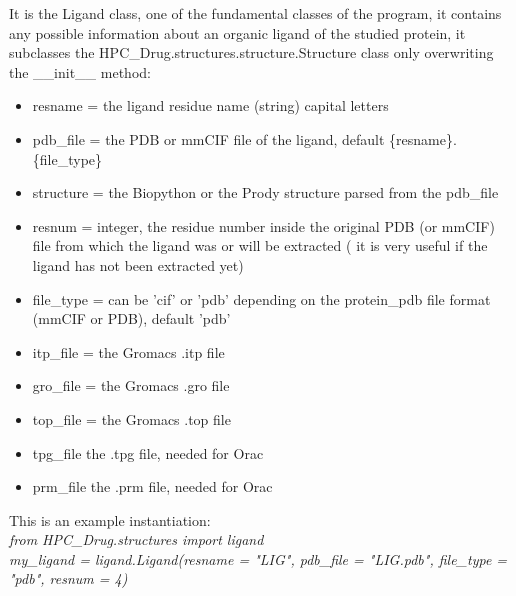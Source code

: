 	It is the Ligand class, one of the fundamental classes of the program, it contains any possible information about an organic ligand of the studied protein, it subclasses the HPC\_Drug.structures.structure.Structure class only overwriting the \_\_init\_\_ method:
	\begin{itemize}
		\item resname = the ligand residue name (string) capital letters
		\item pdb\_file = the PDB or mmCIF file of the ligand, default \{resname\}.\{file\_type\}
		\item structure = the Biopython\cite{biopython} or the Prody\cite{prody} structure parsed from the pdb\_file
		\item resnum = integer, the residue number inside the original PDB (or mmCIF) file from which the ligand was or will be extracted ( it is very useful if the ligand has not been extracted yet)
		\item file\_type = can be 'cif' or 'pdb' depending on the protein\_pdb file format (mmCIF or PDB), default 'pdb'
		\item itp\_file = the Gromacs\cite{gromacs_ABRAHAM201519} .itp file
		\item gro\_file = the Gromacs\cite{gromacs_ABRAHAM201519} .gro file
		\item top\_file = the Gromacs\cite{gromacs_ABRAHAM201519} .top file
		\item tpg\_file the .tpg file, needed for Orac\cite{orac}
		\item prm\_file the .prm file, needed for Orac\cite{orac}
	\end{itemize}
	
	This is an example instantiation:\\
	\textit{from HPC\_Drug.structures import ligand\\
		$\ $\\
		my\_ligand = ligand.Ligand(resname = "LIG", pdb\_file = "LIG.pdb", file\_type = "pdb", resnum = 4)}
	
	
    